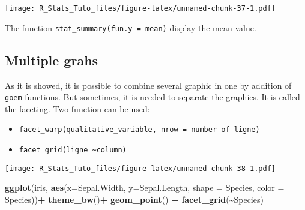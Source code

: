 \documentclass[
]{article}
\newenvironment{Shaded}{\begin{snugshade}}{\end{snugshade}}
\newcommand{\AttributeTok}[1]{\textcolor[rgb]{0.13,0.29,0.53}{#1}}
\newcommand{\ConstantTok}[1]{\textcolor[rgb]{0.56,0.35,0.01}{#1}}
\newcommand{\DecValTok}[1]{\textcolor[rgb]{0.00,0.00,0.81}{#1}}
\newcommand{\FloatTok}[1]{\textcolor[rgb]{0.00,0.00,0.81}{#1}}
\newcommand{\FunctionTok}[1]{\textcolor[rgb]{0.13,0.29,0.53}{\textbf{#1}}}
\newcommand{\NormalTok}[1]{#1}
\newcommand{\SpecialCharTok}[1]{\textcolor[rgb]{0.81,0.36,0.00}{\textbf{#1}}}
\newcommand{\StringTok}[1]{\textcolor[rgb]{0.31,0.60,0.02}{#1}}
\providecommand{\tightlist}{%
  \setlength{\itemsep}{0pt}\setlength{\parskip}{0pt}}
\begin{document}
\texttt{[image: R\_Stats\_Tuto\_files/figure-latex/unnamed-chunk-37-1.pdf]}

The function \texttt{stat\_summary(fun.y\ =\ mean)} display the mean
value.\\

\hypertarget{multiple-grahs}{%
\subsection{Multiple grahs}\label{multiple-grahs}}

As it is showed, it is possible to combine several graphic in one by
addition of \texttt{goem} functions. But sometimes, it is needed to
separate the graphics. It is called the faceting. Two function can be
used:

\begin{itemize}
\tightlist
\item
  \texttt{facet\_warp(qualitative\_variable,\ nrow\ =\ number\ of\ ligne)}
\item
  \texttt{facet\_grid(ligne\ \textasciitilde{}column)}
\end{itemize}

\begin{Shaded}
\end{Shaded}

\texttt{[image: R\_Stats\_Tuto\_files/figure-latex/unnamed-chunk-38-1.pdf]}

\begin{Shaded}
\begin{Highlighting}[]
\FunctionTok{ggplot}\NormalTok{(iris, }\FunctionTok{aes}\NormalTok{(}\AttributeTok{x=}\NormalTok{Sepal.Width, }\AttributeTok{y=}\NormalTok{Sepal.Length, }\AttributeTok{shape =}\NormalTok{ Species, }\AttributeTok{color =}\NormalTok{ Species))}\SpecialCharTok{+}
  \FunctionTok{theme\_bw}\NormalTok{()}\SpecialCharTok{+}
  \FunctionTok{geom\_point}\NormalTok{() }\SpecialCharTok{+} 
  \FunctionTok{facet\_grid}\NormalTok{(}\SpecialCharTok{\textasciitilde{}}\NormalTok{Species)}
\end{Highlighting}
\end{Shaded}
\end{document}
